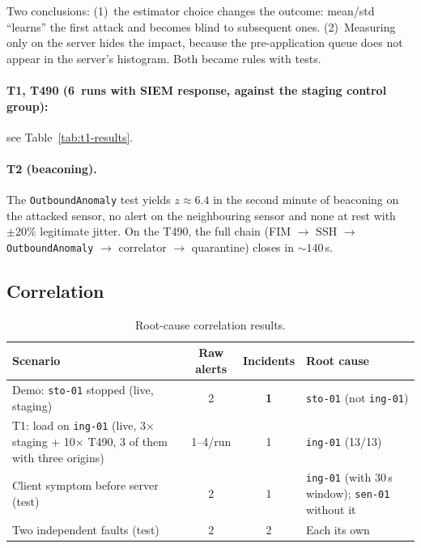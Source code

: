 \documentclass[11pt,a4paper]{article}
\begin{document}
Two conclusions: (1)~the estimator choice changes the outcome: mean/std ``learns'' the first
attack and becomes blind to subsequent ones. (2)~Measuring only on the server hides the
impact, because the pre-application queue does not appear in the server's histogram. Both
became rules with tests.

\paragraph{T1, T490 (6~runs with SIEM response, against the staging control group):}
see Table~\ref{tab:t1-results}.

\paragraph{T2 (beaconing).} The \texttt{OutboundAnomaly} test yields $z \approx 6.4$ in the
second minute of beaconing on the attacked sensor, no alert on the neighbouring sensor and
none at rest with $\pm 20\%$ legitimate jitter. On the T490, the full chain
(FIM $\to$ SSH $\to$ \texttt{OutboundAnomaly} $\to$ correlator $\to$ quarantine) closes in
${\sim}140$\,s.

\subsection{Correlation}

\begin{table}[H]
  \centering
  \caption{Root-cause correlation results.}
  \label{tab:correlation}
  \begin{tabular}{@{}p{4.5cm}ccp{4.5cm}@{}}
    \toprule
    \textbf{Scenario} & \textbf{Raw alerts} & \textbf{Incidents} & \textbf{Root cause} \\
    \midrule
    Demo: \texttt{sto-01} stopped (live, staging) &
      2 & \textbf{1} & \texttt{sto-01} (not \texttt{ing-01}) \\
    T1: load on \texttt{ing-01} (live, 3$\times$ staging + 10$\times$ T490, 3 of them
      with three origins) &
      1--4/run & 1 & \texttt{ing-01} (13/13) \\
    Client symptom before server (test) &
      2 & 1 & \texttt{ing-01} (with 30\,s window); \texttt{sen-01} without it \\
    Two independent faults (test) &
      2 & 2 & Each its own \\
    \bottomrule
  \end{tabular}
\end{table}
\end{document}
